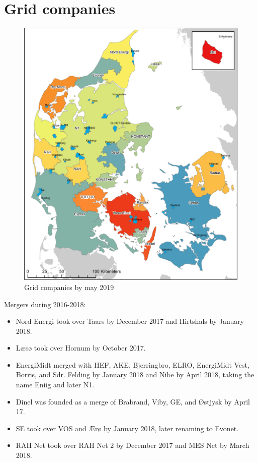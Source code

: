 \section{Grid companies}
\label{app:grids}
\begin{figure}[H]
  \centering
  \caption{Grid companies by may 2019}
  \label{fig:elnetgraenser}
    \includegraphics[width=.9 \textwidth]{03_figures/elnetgraenser_maj2019.pdf}
\end{figure}
\vspace{-1em}
\noindent
Mergers during 2016-2018:
\begin{itemize}[noitemsep]
  \item Nord Energi took over Taars by December 2017 and Hirtshals by January 2018.
  \item Læsø took over Hornum by October 2017.
  \item EnergiMidt merged with HEF, AKE, Bjerringbro, ELRO, EnergiMidt Vest, Borris, and Sdr. Felding by January 2018 and Nibe by April 2018, taking the name Eniig and later N1.
  \item Dinel was founded as a merge of Brabrand, Viby, GE, and Østjysk by April 17.
  \item SE took over VOS and Ærø by January 2018, later renaming to Evonet.
  \item RAH Net took over RAH Net 2 by December 2017 and MES Net by March 2018.
\end{itemize}
